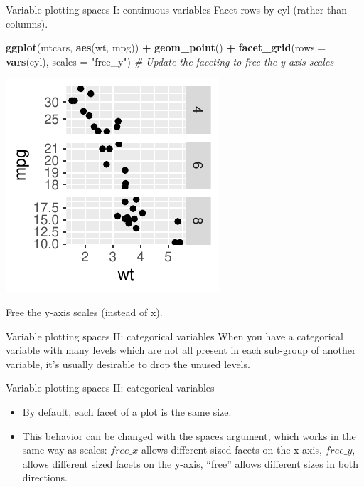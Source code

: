 \documentclass[
  ignorenonframetext,
]{beamer}
\newenvironment{Shaded}{\begin{snugshade}}{\end{snugshade}}
\newcommand{\AttributeTok}[1]{\textcolor[rgb]{0.13,0.29,0.53}{#1}}
\newcommand{\CommentTok}[1]{\textcolor[rgb]{0.56,0.35,0.01}{\textit{#1}}}
\newcommand{\FunctionTok}[1]{\textcolor[rgb]{0.13,0.29,0.53}{\textbf{#1}}}
\newcommand{\NormalTok}[1]{#1}
\newcommand{\SpecialCharTok}[1]{\textcolor[rgb]{0.81,0.36,0.00}{\textbf{#1}}}
\newcommand{\StringTok}[1]{\textcolor[rgb]{0.31,0.60,0.02}{#1}}
\begin{document}
\begin{frame}[fragile]{Variable plotting spaces I: continuous variables}
\label{variable-plotting-spaces-i-continuous-variables-6}
Facet rows by cyl (rather than columns).


\begin{Shaded}
\begin{Highlighting}[]
\FunctionTok{ggplot}\NormalTok{(mtcars, }\FunctionTok{aes}\NormalTok{(wt, mpg)) }\SpecialCharTok{+} \FunctionTok{geom\_point}\NormalTok{() }\SpecialCharTok{+} \FunctionTok{facet\_grid}\NormalTok{(}\AttributeTok{rows =} \FunctionTok{vars}\NormalTok{(cyl),}
    \AttributeTok{scales =} \StringTok{"free\_y"}\NormalTok{)  }\CommentTok{\# Update the faceting to free the y{-}axis scales}
\end{Highlighting}
\end{Shaded}

\begin{center}\includegraphics[width=0.5\linewidth]{Figs/unnamed-chunk-90-1} \end{center}

Free the y-axis scales (instead of x).
\end{frame}

\begin{frame}{Variable plotting spaces II: categorical variables}
\label{variable-plotting-spaces-ii-categorical-variables}
When you have a categorical variable with many levels which are not all
present in each sub-group of another variable, it's usually desirable to
drop the unused levels.
\end{frame}

\begin{frame}{Variable plotting spaces II: categorical variables}
\label{variable-plotting-spaces-ii-categorical-variables-1}
\begin{itemize}
\item
  By default, each facet of a plot is the same size.
\item
  This behavior can be changed with the spaces argument, which works in
  the same way as scales: \(free\_x\) allows different sized facets on
  the x-axis, \(free\_y\), allows different sized facets on the y-axis,
  ``free'' allows different sizes in both directions.
\end{itemize}
\end{frame}
\end{document}
